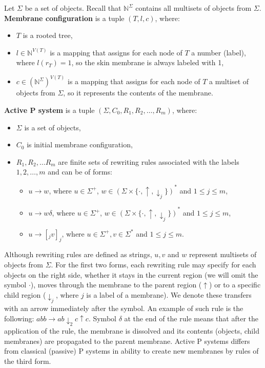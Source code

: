 Let $\Sigma$ be a set of objects. Recall that $\mathbb N^\Sigma$ contains all multisets of objects from $\Sigma$. {\bf Membrane configuration} is a tuple $(T, l, c)$, where:
\begin{itemize}
  \item $T$ is a rooted tree,
  \item $l\in\mathbb N^{V(T)}$ is a mapping that assigns for each node of $T$ a number (label), where $l(r_T)=1$, so the skin membrane is always labeled with 1,
  \item $c\in(\mathbb N^\Sigma)^{V(T)}$ is a mapping that assigns for each node of $T$ a multiset of objects from $\Sigma$, so it represents the contents of the membrane.
\end{itemize}

{\bf Active P system} is a tuple $(\Sigma, C_0, R_1, R_2, \dots , R_m)$, where:
\begin{itemize}
  \item $\Sigma$ is a set of objects,
  \item $C_0$ is initial membrane configuration,
  \item $R_1,R_2,\dots R_m$ are finite sets of rewriting rules associated with the labels $1,2,\dots,m$ and can be of forms:
  \begin{itemize}
    \item $u\rightarrow w$, where $u\in \Sigma^+$, $w\in (\Sigma\times\{\cdot, \uparrow, \downarrow_j\})^*$ and $1\leq j\leq m$,
    \item $u\rightarrow w\delta$, where $u\in \Sigma^+$, $w\in (\Sigma\times\{\cdot, \uparrow, \downarrow_j\})^*$ and $1\leq j\leq m$,
    \item $u\rightarrow [_j v]_j$, where $u\in \Sigma^+, v\in \Sigma^*$ and $1\leq j\leq m$.
  \end{itemize}
\end{itemize}

Although rewriting rules are defined as strings, $u,v$ and $w$ represent multisets of objects from $\Sigma$. For the first two forms, each rewriting rule may specify for each objects on the right side, whether it stays in the current region (we will omit the symbol $\cdot$), moves through the membrane to the parent region ($\uparrow$)
or to a specific child region ($\downarrow_j$, where $j$ is a label of a membrane).
We denote these transfers with an arrow immediately after the symbol.
An example of such rule is the following: $abb\rightarrow ab\downarrow_2 c\uparrow c$.
Symbol $\delta$ at the end of the rule means that after the application of the rule, the membrane is dissolved and its contents (objects, child membranes) are propagated to the parent membrane.
Active P systems differs from classical (passive) P systems in ability to create new membranes by rules of the third form.

